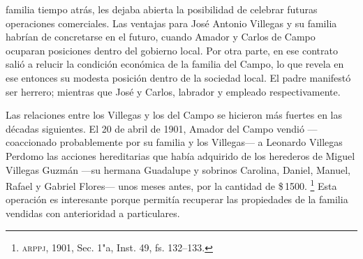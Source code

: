 \documentclass[14pt,twoside,final]{extbook} %
\let\oldfootnote\footnote
\renewcommand\footnote[1]{%
\oldfootnote{\hspace{1mm}#1}}
\begin{document}
familia tiempo atrás, les dejaba abierta la posibilidad de celebrar futuras operaciones comerciales. Las ventajas para José Antonio Villegas y su familia habrían de concretarse en el futuro, cuando Amador y Carlos de Campo ocuparan posiciones dentro del gobierno local. Por otra parte, en ese contrato salió a relucir la condición económica de la familia del Campo, lo que revela en ese entonces su modesta posición dentro de la sociedad local. El padre manifestó ser herrero; mientras que José y Carlos, labrador y empleado respectivamente.

Las relaciones entre los Villegas y los del Campo se hicieron más fuertes en las décadas siguientes. El 20 de abril de 1901, Amador del Campo vendió ---coaccionado probablemente por su familia y los Villegas--- a Leonardo Villegas Perdomo las acciones hereditarias que había adquirido de los herederos de Miguel Villegas Guzmán ---su hermana Guadalupe y sobrinos Carolina, Daniel, Manuel, Rafael y Gabriel Flores--- unos meses antes, por la cantidad de \$\,1500.\footnote{\textsc{arppj}, 1901, Sec. 1"a, Inst. 49, fs. 132--133.} Esta operación es interesante porque permitía recuperar las propiedades de la familia vendidas con anterioridad a particulares.
\end{document}
